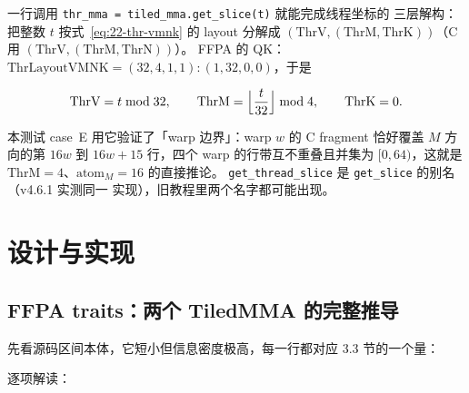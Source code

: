 一行调用 \texttt{thr\_\allowbreak{}mma =\allowbreak{} tiled\_\allowbreak{}mma.\allowbreak{}get\_\allowbreak{}slice\allowbreak{}(t)} 就能完成线程坐标的
三层解构：把整数 $t$ 按式~\eqref{eq:22-thr-vmnk} 的 layout 分解成
$(\mathrm{ThrV},(\mathrm{ThrM},\mathrm{ThrK}))$（C 用 $(\mathrm{ThrV},(\mathrm{ThrM},\mathrm{ThrN}))$）。
FFPA 的 QK：$\mathrm{ThrLayoutVMNK} = (32,4,1,1){:}(1,32,0,0)$，于是

\begin{equation}
  \mathrm{ThrV} = t \bmod 32,\qquad \mathrm{ThrM} = \Bigl\lfloor\frac{t}{32}
  \Bigr\rfloor \bmod 4 , \qquad \mathrm{ThrK} = 0 .
  \label{eq:22-get-slice}
\end{equation}

本测试 case~E 用它验证了「warp 边界」：warp $w$ 的 C fragment 恰好覆盖
$M$ 方向的第 $16w$ 到 $16w+15$ 行，四个 warp 的行带互不重叠且并集为
$[0,64)$，这就是 $\mathrm{ThrM}=4$、$\mathrm{atom}_M=16$ 的直接推论。
\texttt{get\_\allowbreak{}thread\_\allowbreak{}slice} 是 \texttt{get\_slice} 的别名（v4.6.1 实测同一
实现），旧教程里两个名字都可能出现。

\section{设计与实现}

\subsection{FFPA traits：两个 TiledMMA 的完整推导}

先看源码区间本体，它短小但信息密度极高，每一行都对应 3.3 节的一个量：



逐项解读：


